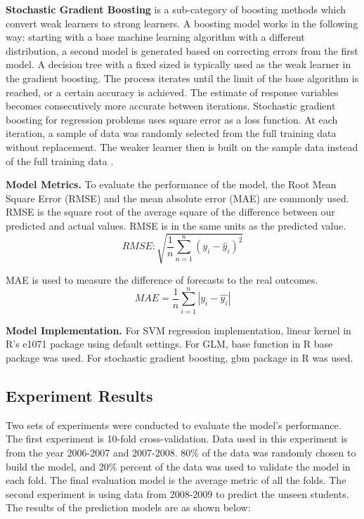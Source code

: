 \documentclass[12pt,english]{report}
\begin{document}
\vspace{0.15in}
\noindent \textbf{Stochastic Gradient Boosting} is a sub-category of boosting methods which convert weak learners to strong learners. A boosting model works in the following way: starting with a base machine learning algorithm with a different distribution,  a second model is generated based on correcting errors from the first model. A decision tree with a fixed sized is typically used as the weak learner in the gradient boosting. The process iterates until the limit of the base algorithm is reached, or a certain accuracy is achieved. The estimate of response variables becomes consecutively more accurate between iterations. Stochastic gradient boosting for regression problems uses square error as a loss function. At each iteration, a sample of data was randomly selected from the full training data without replacement. The weaker learner then is built on the sample data instead of the full training data \citep{FRIEDMAN2002367}. 
% 
% 

\vspace{0.15in}
\noindent \textbf{Model Metrics.} To evaluate the performance of the model, the Root Mean Square Error (RMSE)  and the mean absolute error (MAE) are commonly used. 
RMSE is the square root of the average square of the difference between our predicted and actual values. RMSE is in the same units as the predicted value.
\begin{equation}
RMSE:  \sqrt{\frac{1}{n}\sum_{n=1}^n (y_i-\hat{y}_i)^2}
\end{equation}

MAE is used to measure the difference of forecasts to the real outcomes.
\begin{equation}
MAE = \frac{1}{n}\sum_{i=1}^n \left| y_i - \hat{y_i}\right| 
\end{equation}

\vspace{0.15in}
\textbf{Model Implementation.} For SVM regression implementation, linear kernel in R's  e1071 package \citep{e1071} using default settings. For GLM,  base function in R base package was used. For stochastic gradient boosting, gbm package in R \citep{gbm} was used.

\subsection{Experiment Results}
Two sets of experiments were conducted to evaluate the model's performance. The 
first experiment is 10-fold cross-validation. Data used in this experiment is from 
the year 2006-2007 and 2007-2008.  80\% of the data was randomly chosen 
to build the model, and 20\% percent of the data was used to validate the model in 
each fold. The final evaluation model is the average metric of all the folds. The 
second experiment is using data from 2008-2009 to predict the unseen students.  The 
results of the prediction models are as shown below:
\end{document}
